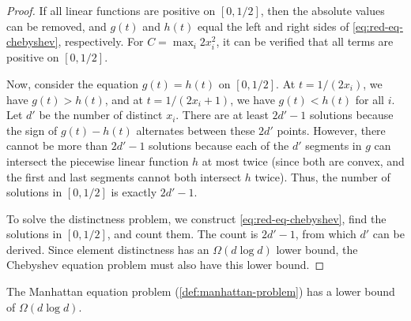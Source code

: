 \begin{proof}
	If all linear functions are positive on \([0, 1/2]\), then the absolute values can be removed, and \(g(t)\) and \(h(t)\) equal the left and right sides of \cref{eq:red-eq-chebyshev}, respectively. For \(C = \max_i 2x_i^2\), it can be verified that all terms are positive on \([0, 1/2]\).

	Now, consider the equation \(g(t) = h(t)\) on \([0, 1/2]\). At \(t = 1/(2x_i)\), we have \(g(t) > h(t)\), and at \(t = 1/(2x_i + 1)\), we have \(g(t) < h(t)\) for all \(i\). Let \(d'\) be the number of distinct \(x_i\). There are at least \(2d' - 1\) solutions because the sign of \(g(t)-h(t)\) alternates between these \(2d'\) points. However, there cannot be more than \(2d' - 1\) solutions because each of the \(d'\) segments in \(g\) can intersect the piecewise linear function \(h\) at most twice (since both are convex, and the first and last segments cannot both intersect \(h\) twice). Thus, the number of solutions in \([0, 1/2]\) is exactly \(2d' - 1\).

	To solve the distinctness problem, we construct \cref{eq:red-eq-chebyshev}, find the solutions in \([0, 1/2]\), and count them. The count is \(2d' - 1\), from which \(d'\) can be derived. Since element distinctness has an \(\Omega(d \log d)\) lower bound, the Chebyshev equation problem must also have this lower bound.
\end{proof}

\begin{lemma}
	The Manhattan equation problem (\cref{def:manhattan-problem}) has a lower bound of \(\Omega(d \log d)\).
\end{lemma}

